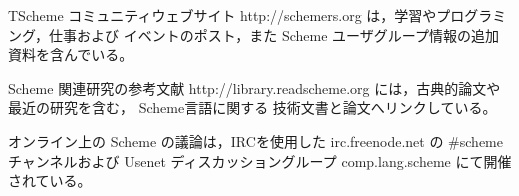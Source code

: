 

TScheme コミュニティウェブサイト
{\cf http://schemers.org}
は，学習やプログラミング，仕事および
イベントのポスト，また Scheme ユーザグループ情報の追加資料を含んでいる。

Scheme 関連研究の参考文献
{\cf http://library.readscheme.org}
には，古典的論文や最近の研究を含む， Scheme言語に関する
技術文書と論文へリンクしている。

オンライン上の Scheme の議論は，IRCを使用した
{\cf irc.freenode.net} の {\cf \#scheme} チャンネルおよび
Usenet ディスカッショングループ {\cf comp.lang.scheme} にて開催されている。
